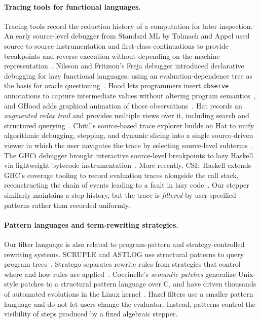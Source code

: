 \paragraph*{Tracing tools for functional languages.}
Tracing tools record the reduction history of a computation for later
inspection. An early source-level debugger from Standard ML by Tolmach and
Appel used source-to-source instrumentation and first-class continuations to
provide breakpoints and reverse execution without depending on the machine
representation~\cite{tolmach1995debugger}. Nilsson and Fritzson's Freja
debugger introduced declarative debugging for lazy functional languages, using
an evaluation-dependence tree as the basis for oracle
questioning~\cite{nilsson1994algorithmic}. Hood lets programmers insert
\texttt{observe} annotations to capture intermediate values without altering
program semantics~\cite{gill2000hood}, and GHood adds graphical animation of
those observations~\cite{reinke2001ghood}. Hat records an \emph{augmented
redex trail} and provides multiple views over it, including search and
structured querying~\cite{wallace2001hat}. Chitil's source-based trace
explorer builds on Hat to unify algorithmic debugging, stepping, and dynamic
slicing into a single source-driven viewer in which the user navigates the
trace by selecting source-level subterms~\cite{chitil2005source}. The GHCi
debugger brought interactive source-level breakpoints to lazy Haskell via
lightweight bytecode instrumentation~\cite{marlow2007ghci}. More recently,
CSI:~Haskell extends GHC's coverage tooling to record evaluation traces
alongside the call stack, reconstructing the chain of events leading to a
fault in lazy code~\cite{gissurarson2023csi}. Our stepper similarly maintains
a step history, but the trace is \emph{filtered} by user-specified patterns
rather than recorded uniformly.

\paragraph*{Pattern languages and term-rewriting strategies.}
Our filter language is also related to program-pattern and
strategy-controlled rewriting systems. SCRUPLE and ASTLOG use structural
patterns to query program trees~\cite{paul1994scruple,crew1997astlog}.
Stratego separates rewrite rules from strategies that control where and how
rules are applied~\cite{visser2001stratego}. Coccinelle's \emph{semantic
patches} generalize Unix-style patches to a structural pattern language over
C, and have driven thousands of automated evolutions in the Linux
kernel~\cite{padioleau2008coccinelle}. Hazel filters use a smaller pattern
language and do not let users change the evaluator. Instead, patterns control
the visibility of steps produced by a fixed algebraic stepper.


